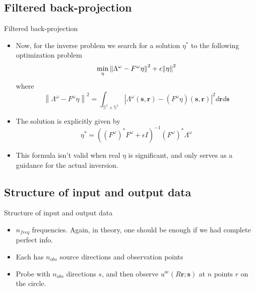 \documentclass{beamer}
\begin{document}
\subsection{Filtered back-projection}
\begin{frame}{Filtered back-projection}
\begin{itemize}
    \item Now, for the inverse problem we search for a solution $\eta^*$ to the following optimization problem
    \begin{equation}
        \min _\eta\left\|\Lambda^\omega-F^\omega \eta\right\|^2  + \epsilon \norm{\eta}^2
    \end{equation}
    where 
    \begin{equation}
        \left\|\Lambda^\omega-F^\omega \eta\right\|^2=\int_{\mathbb{S}^1 \times \mathbb{S}^1}\left|\Lambda^\omega(\boldsymbol{s}, \boldsymbol{r})-\left(F^\omega \eta\right)(\boldsymbol{s}, \boldsymbol{r})\right|^2 d \boldsymbol{r} d \boldsymbol{s}
    \end{equation}
    \item The solution is explicitly given by 
    \begin{equation}
        \eta^* = ((F^\omega)^* F^\omega + \epsilon I)^{-1} (F^\omega)^* \Lambda^\omega
    \end{equation}
    \item This formula isn't valid when real $\eta$ is significant, and only serves as a guidance for the actual inversion.
    
\end{itemize}
    
\end{frame}

\subsection{Structure of input and output data}
\begin{frame}{Structure of input and output data}
    \begin{itemize}
        \item $n_{freq}$ frequencies. Again, in theory, one should be enough if we had complete perfect info.
        \item Each has $n_{obs}$ source directions and observation points
        \item Probe with $n_{obs}$ directions $s$, and then observe $u^{\text{sc}}(R \mathbf{r}; \mathbf{s})$ at $n$ points $r$ on the circle.
        
    \end{itemize}
\end{frame}
\end{document}
